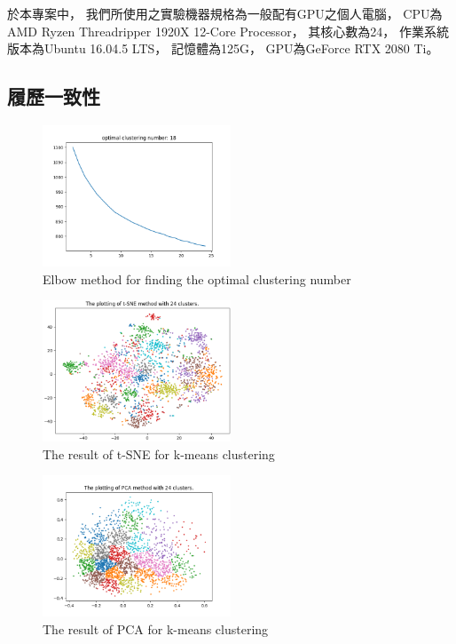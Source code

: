 \documentclass[sigconf]{acmart}
\begin{document}
於本專案中，
我們所使用之實驗機器規格為一般配有GPU之個人電腦，
CPU為AMD Ryzen Threadripper 1920X 12-Core Processor，
其核心數為24，
作業系統版本為Ubuntu 16.04.5 LTS，
記憶體為125G，
GPU為GeForce RTX 2080 Ti。

\subsection{履歷一致性}

\begin{figure}
    \centerline{\includegraphics[width=0.5\textwidth]{elbow_method.png}}
    \caption{Elbow method for finding the optimal clustering number}
    \label{elbow_method}
\end{figure}

\begin{figure}
    \centerline{\includegraphics[width=0.5\textwidth]{t_sne.png}}
    \caption{The result of t-SNE for k-means clustering}
    \label{t_sne}
\end{figure}

\begin{figure}
    \centerline{\includegraphics[width=0.5\textwidth]{pca.png}}
    \caption{The result of PCA for k-means clustering}
    \label{pca}
\end{figure}
\end{document}
